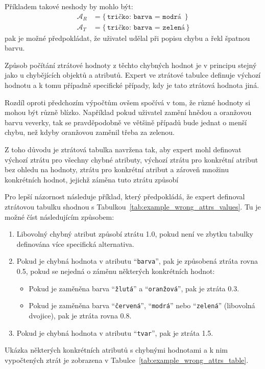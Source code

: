Příkladem takové neshody by mohlo být:
\begin{align*}
	\mathcal{A}_{R} & = \bigl\{ \, \texttt{tričko: barva = modrá } \, \bigr\} \\
	\mathcal{A}_{T} & = \bigl\{ \, \texttt{tričko: barva = zelená} \, \bigr\}
\end{align*}
pak je možné předpokládat, že uživatel udělal při popisu chybu a řekl špatnou barvu.

Způsob počítání ztrátové hodnoty z těchto chybných hodnot je v principu stejný jako u chybějících objektů a atributů.
Expert ve ztrátové tabulce definuje výchozí hodnotu a k tomu případně specifické případy, kdy je tato ztrátová hodnota jiná.

Rozdíl oproti předchozím výpočtům ovšem spočívá v tom, že různé hodnoty si mohou být různě blízko.
Například pokud uživatel zamění hnědou a oranžovou barvu veverky, tak se pravděpodobně ve většině případů bude jednat o menší chybu,
než kdyby oranžovou zaměnil třeba za zelenou.

Z toho důvodu je ztrátová tabulka navržena tak, aby expert mohl definovat výchozí ztrátu pro všechny chybné atributy,
výchozí ztrátu pro konkrétní atribut bez ohledu na hodnoty, ztrátu pro konkrétní atribut a zároveň množinu konkrétních hodnot, jejichž záměna tuto ztrátu způsobí

Pro lepší názornost následuje příklad, který předpokládá, že expert definoval ztrátovou tabulku shodnou s Tabulkou~\ref{tab:example_wrong_attrs_values}.
Tu je možné číst následujícím způsobem:
\begin{enumerate}
	\item Libovolný chybný atribut způsobí ztrátu 1.0, pokud není ve zbytku tabulky definována více specifická alternativa.
	\item Pokud je chybná hodnota v atributu \enquote{\texttt{barva}}, pak je způsobená ztráta rovna 0.5, pokud se nejedná o záměnu některých konkrétních hodnot:
	      \begin{itemize}
		      \item Pokud je zaměněna barva \enquote{\texttt{žlutá}} a \enquote{\texttt{oranžová}}, pak je ztráta 0.3.
		      \item Pokud je zaměněna barva \enquote{\texttt{červená}}, \enquote{\texttt{modrá}} nebo \enquote{\texttt{zelená}} (libovolná dvojice), pak je ztráta rovna 0.8.
	      \end{itemize}
	\item Pokud je chybná hodnota v atributu \enquote{\texttt{tvar}}, pak je ztráta 1.5.
\end{enumerate}
Ukázka některých konkrétních atributů s chybnými hodnotami a k nim vypočtených ztrát je zobrazena v Tabulce~\ref{tab:example_wrong_attrs_table}.

